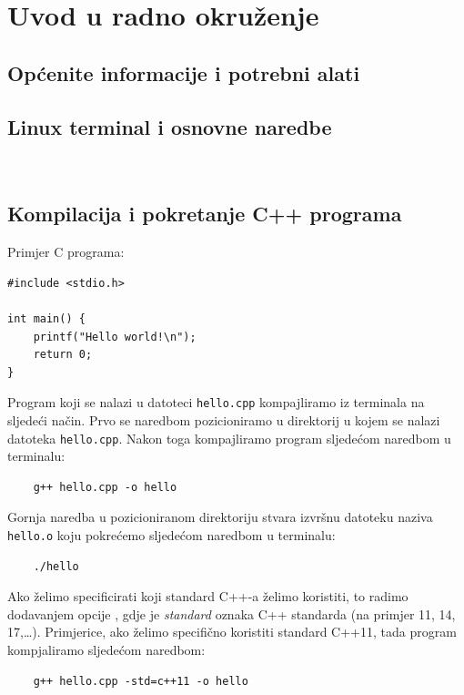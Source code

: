 \chapter{Uvod u radno okruženje}

\section{Općenite informacije i potrebni alati}

\section{Linux terminal i osnovne naredbe}

    \begin{verbatim}
        
    \end{verbatim}

\section{Kompilacija i pokretanje C++ programa}

Primjer C programa:

\begin{verbatim}
#include <stdio.h>

int main() {
    printf("Hello world!\n");
    return 0;
}
\end{verbatim}

Program koji se nalazi u datoteci \texttt{hello.cpp} kompajliramo iz terminala na sljedeći način.
Prvo se naredbom  pozicioniramo u direktorij u kojem se nalazi datoteka \texttt{hello.cpp}. Nakon toga kompajliramo program sljedećom naredbom u terminalu:
\begin{verbatim}
    g++ hello.cpp -o hello
\end{verbatim}



Gornja naredba u pozicioniranom direktoriju stvara izvršnu datoteku naziva \texttt{hello.o} koju pokrećemo sljedećom naredbom u terminalu:
\begin{verbatim}
    ./hello
\end{verbatim}

Ako želimo specificirati koji standard C++-a želimo koristiti, to radimo dodavanjem opcije , gdje je \textit{standard} oznaka C++ standarda (na primjer 11, 14, 17,\dots).
Primjerice, ako želimo specifično koristiti standard C++11, tada program kompjaliramo sljedećom naredbom:

\begin{verbatim}
    g++ hello.cpp -std=c++11 -o hello
\end{verbatim}

